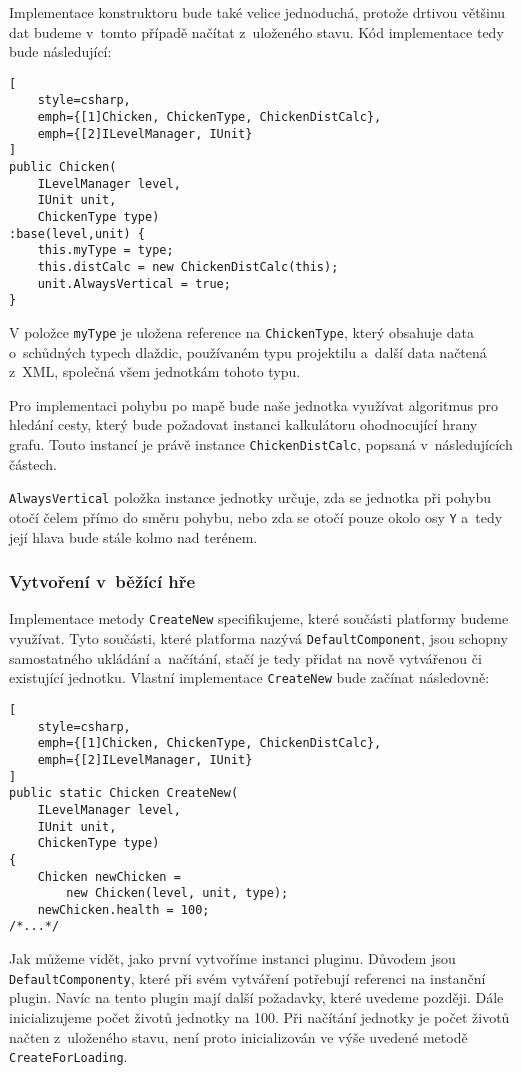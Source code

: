 Implementace konstruktoru bude také velice jednoduchá, protože drtivou většinu dat budeme v~tomto případě načítat z~uloženého stavu. Kód implementace tedy bude následující:

\begin{lstlisting}[
	style=csharp,
	emph={[1]Chicken, ChickenType, ChickenDistCalc},
	emph={[2]ILevelManager, IUnit}
]
public Chicken(
	ILevelManager level, 
	IUnit unit, 
	ChickenType type) 
:base(level,unit) {
	this.myType = type;
	this.distCalc = new ChickenDistCalc(this);	
	unit.AlwaysVertical = true;
}
\end{lstlisting}

V položce \texttt{myType} je uložena reference na \texttt{ChickenType}, který obsahuje data o~schůdných typech dlaždic, používaném typu projektilu a~další data načtená z~XML, společná všem jednotkám tohoto typu.

Pro implementaci pohybu po mapě bude naše jednotka využívat algoritmus pro hledání cesty, který bude požadovat instanci kalkulátoru ohodnocující hrany grafu. Touto instancí je právě instance \texttt{ChickenDistCalc}, popsaná v~následujících částech.

\texttt{AlwaysVertical} položka instance jednotky určuje, zda se jednotka při pohybu otočí čelem přímo do směru pohybu, nebo zda se otočí pouze okolo osy \texttt{Y} a~tedy její hlava bude stále kolmo nad terénem.

\subsubsection{Vytvoření v~běžící hře}
\label{sec:instantiation}

Implementace metody \texttt{CreateNew} specifikujeme, které součásti platformy budeme využívat. Tyto součásti, které platforma nazývá \texttt{DefaultComponent}, jsou schopny samostatného ukládání a~načítání, stačí je tedy přidat na nově vytvářenou či existující jednotku. Vlastní implementace \texttt{CreateNew} bude začínat následovně: 

\begin{lstlisting}[
	style=csharp,
	emph={[1]Chicken, ChickenType, ChickenDistCalc},
	emph={[2]ILevelManager, IUnit}
]
public static Chicken CreateNew(
	ILevelManager level, 
	IUnit unit, 
	ChickenType type)
{
	Chicken newChicken = 
		new Chicken(level, unit, type);
	newChicken.health = 100;
/*...*/
\end{lstlisting}

Jak můžeme vidět, jako první vytvoříme instanci pluginu. Důvodem jsou \texttt{DefaultComponenty}, které při svém vytváření potřebují referenci na instanční plugin. Navíc na tento plugin mají další požadavky, které uvedeme později. Dále inicializujeme počet životů jednotky na 100. Při načítání jednotky je počet životů načten z~uloženého stavu, není proto inicializován ve výše uvedené metodě \texttt{CreateForLoading}.

